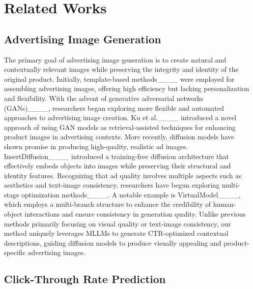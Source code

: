 \section{Related Works}
\subsection{Advertising Image Generation}

The primary goal of advertising image generation is to create natural and contextually relevant images while preserving the integrity and identity of the original product. Initially, template-based methods____ were employed for assembling advertising images, offering high efficiency but lacking personalization and flexibility.
With the advent of generative adversarial networks (GANs)____, researchers began exploring more flexible and automated approaches to advertising image creation. Ku et al.____ introduced a novel approach of using GAN models as retrieval-assisted techniques for enhancing product images in advertising contexts.
%
More recently, diffusion models have shown promise in producing high-quality, realistic ad images. InsertDiffusion____ introduced a training-free diffusion architecture that effectively embeds objects into images while preserving their structural and identity features. 
%
Recognizing that ad quality involves multiple aspects such as aesthetics and text-image consistency, researchers have begun exploring multi-stage optimization methods____. A notable example is VirtualModel____, which employs a multi-branch structure to enhance the credibility of human-object interactions and ensure consistency in generation quality. 
Unlike previous methods primarily focusing on visual quality or text-image consistency, our method uniquely leverages MLLMs to generate CTR-optimized contextual descriptions, guiding diffusion models to produce visually appealing and product-specific advertising images.


\subsection{Click-Through Rate Prediction}

